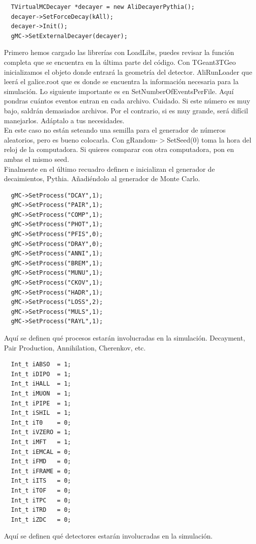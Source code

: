 \documentclass{article}
\begin{document}
\begin{tcolorbox}[breakable]
\begin{verbatim}
  TVirtualMCDecayer *decayer = new AliDecayerPythia();
  decayer->SetForceDecay(kAll);
  decayer->Init();
  gMC->SetExternalDecayer(decayer);
\end{verbatim}
\end{tcolorbox}
Primero hemos cargado las librer\'ias con LoadLibs, puedes revisar la funci\'on completa que se encuentra en la \'ultima parte del c\'odigo. Con TGeant3TGeo inicializamos el objeto donde entrar\'a la geometr\'ia del detector. AliRunLoader que leer\'a el galice.root que es donde se encuentra la informaci\'on necesaria para la simulaci\'on. Lo siguiente importante es en SetNumberOfEventsPerFile. Aqu\'i pondras cu\'antos eventos entran en cada archivo. Cuidado. Si este n\'umero es muy bajo, saldr\'an demasiados archivos. Por el contrario, si es muy grande, ser\'a dif\'icil manejarlos. Ad\'aptalo a tus necesidades.\\
En este caso no est\'an seteando una semilla para el generador de n\'umeros aleatorios, pero es bueno colocarla. Con gRandom-$>$SetSeed(0) toma la hora del reloj de la computadora. Si quieres comparar con otra computadora, pon en ambas el mismo seed.\\
Finalmente en el \'ultimo recuadro definen e inicializan el generador de decaimientos, Pythia. Añadi\'endolo al generador de Monte Carlo.\\
\begin{tcolorbox}[breakable]
\begin{verbatim}
  gMC->SetProcess("DCAY",1);
  gMC->SetProcess("PAIR",1);
  gMC->SetProcess("COMP",1);
  gMC->SetProcess("PHOT",1);
  gMC->SetProcess("PFIS",0);
  gMC->SetProcess("DRAY",0);
  gMC->SetProcess("ANNI",1);
  gMC->SetProcess("BREM",1);
  gMC->SetProcess("MUNU",1);
  gMC->SetProcess("CKOV",1);
  gMC->SetProcess("HADR",1);
  gMC->SetProcess("LOSS",2);
  gMC->SetProcess("MULS",1);
  gMC->SetProcess("RAYL",1);
\end{verbatim}
\end{tcolorbox}
Aqu\'i se definen qu\'e procesos estar\'an involucradas en la simulaci\'on. Decayment, Pair Production, Annihilation, Cherenkov, etc.
\begin{tcolorbox}[breakable]
\begin{verbatim}
  Int_t iABSO  = 1;
  Int_t iDIPO  = 1;
  Int_t iHALL  = 1;
  Int_t iMUON  = 1;
  Int_t iPIPE  = 1;
  Int_t iSHIL  = 1;
  Int_t iT0    = 0;
  Int_t iVZERO = 1;
  Int_t iMFT   = 1;
  Int_t iEMCAL = 0;
  Int_t iFMD   = 0;
  Int_t iFRAME = 0;
  Int_t iITS   = 0;
  Int_t iTOF   = 0;
  Int_t iTPC   = 0;
  Int_t iTRD   = 0;
  Int_t iZDC   = 0;
\end{verbatim}
\end{tcolorbox}
Aqu\'i se definen qu\'e detectores estar\'an involucradas en la simulaci\'on.\\
\end{document}
